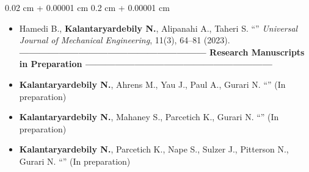 \documentclass[10pt, letterpaper]{article}
\newenvironment{highlights}{
    \begin{itemize}[
        topsep=0.10 cm,
        parsep=0.10 cm,
        partopsep=0pt,
        itemsep=0pt,
        leftmargin=0.2 cm + 10pt
    ]
}{
    \end{itemize}
} %
\newenvironment{onecolentry}{
    \begin{adjustwidth}{
        0.02 cm + 0.00001 cm
    }{
        0.2 cm + 0.00001 cm
    }
}{
    \end{adjustwidth}
} %
\let\hrefWithoutArrow\href
\renewcommand{\href}[2]{\hrefWithoutArrow{#1}{#2}}
\begin{document}
\begin{onecolentry}
\begin{highlights}
    
    \item Hamedi B., \textbf{Kalantaryardebily N.}, Alipanahi A., Taheri S. ``{\href{https://www.hrpub.org/download/20231030/UJME2-15134284.pdf}{\color{black}{Estimating Tire Forces using MLP Neural Network and LM Algorithm: A Comparative Study}}}'' \textit{Universal Journal of Mechanical Engineering}, 11(3), 64–81 (2023).
    \\
\textbf{ --------------------------------------------------------- Research Manuscripts in Preparation ---------------------------------------------------------}

    \item \textbf{Kalantaryardebily N.}, Ahrens M., Yau J., Paul A., Gurari N. ``{\href{ }{\color{black}{Sensorimotor gating amplifies with increasing ipsilateral, contralateral, and bilateral elbow motor activation}}}'' (In preparation)%
    
    \item \textbf{Kalantaryardebily N.}, Mahaney S., Parcetich K., Gurari N. ``{\href{ }{\color{black}{Development and Validation of a Somatosensory Assessment System for Investigating the Impact of Voluntary Movement on Tactile Perception}}}'' (In preparation)%



    \item \textbf{Kalantaryardebily N.}, Parcetich K., Nape S., Sulzer J., Pitterson N., Gurari N. ``{\href{ }{\color{black}{Immersive Neurorehabilitation Education Improves Competencies Relevant to Human-Centered Biomedical Engineering Practice}}}'' (In preparation)





\end{highlights}
\end{onecolentry}
\end{document}
